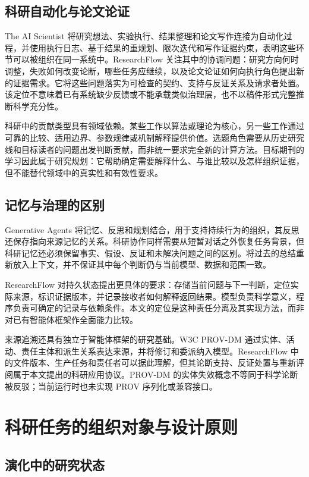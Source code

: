 \documentclass[UTF8,fontset=fandol,a4paper,11pt]{ctexart}
\begin{document}
\subsection{科研自动化与论文论证}

The AI Scientist 将研究想法、实验执行、结果整理和论文写作连接为自动化过程，并使用执行日志、基于结果的重规划、限次迭代和写作证据约束\cite{r4}，表明这些环节可以被组织在同一系统中。ResearchFlow 关注其中的协调问题：研究方向何时调整，失败如何改变论断，哪些任务应继续，以及论文论证如何向执行角色提出新的证据需求。它将这些问题落实为可检查的契约、支持与反证关系及请求者处置。该定位不意味着已有系统缺少反馈或不能承载类似治理层，也不以稿件形式完整推断科学充分性。

科研中的贡献类型具有领域依赖。某些工作以算法或理论为核心，另一些工作通过可靠的比较、适用边界、参数规律或机制解释提供价值。选题角色需要从历史研究线和目标读者的问题出发判断贡献，而非统一要求完全新的计算方法。目标期刊的学习因此属于研究规划：它帮助确定需要解释什么、与谁比较以及怎样组织证据，但不能替代领域中的真实性和有效性要求。

\subsection{记忆与治理的区别}

Generative Agents 将记忆、反思和规划结合，用于支持持续行为的组织，其反思还保存指向来源记忆的关系\cite{r5}。科研协作同样需要从短暂对话之外恢复任务背景，但科研记忆还必须保留事实、假设、反证和未解决问题之间的区别。将过去的总结重新放入上下文，并不保证其中每个判断仍与当前模型、数据和范围一致。

ResearchFlow 对持久状态提出更具体的要求：存储当前问题与下一判断，定位实际来源，标识证据版本，并记录接收者如何解释返回结果。模型负责科学意义，程序负责可确定的记录与依赖条件。本文的定位是这种责任分离及其实现方法，而非对已有智能体框架作全面能力比较。

来源追溯还具有独立于智能体框架的研究基础。W3C PROV-DM 通过实体、活动、责任主体和派生关系表达来源，并将修订和委派纳入模型\cite{r10}。ResearchFlow 中的文件版本、生产任务和责任者可以据此理解，但其论断支持、反证处置与重新评阅属于本文提出的科研应用协议。PROV-DM 的实体失效概念不等同于科学论断被反驳；当前运行时也未实现 PROV 序列化或兼容接口。

\section{科研任务的组织对象与设计原则}

\subsection{演化中的研究状态}
\end{document}
